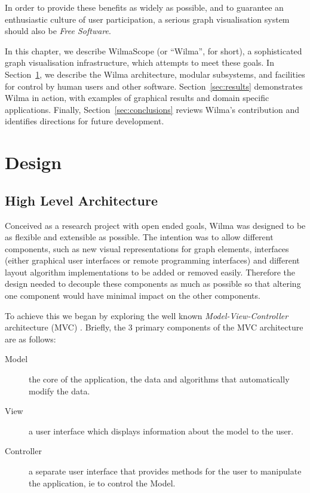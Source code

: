\documentclass[runningheads]{cl2emult}
\begin{document}
In order to provide these benefits as widely as possible, and to guarantee
an enthusiastic culture of user participation, a serious graph visualisation
system should also be {\em Free Software}\cite{stallman92why}.

In this chapter, we describe WilmaScope (or ``Wilma'', for short), a
sophisticated graph visualisation infrastructure, which attempts to meet
these goals.  In Section~\ref{sec:design}, we describe the Wilma
architecture, modular subsystems, and facilities for control by human users
and other software.  Section~\ref{sec:results} demonstrates Wilma in action,
with examples of graphical results and domain specific applications.
Finally, Section~\ref{sec:conclusions} reviews Wilma's contribution and
identifies directions for future development.

\section{Design}\label{sec:design}
\subsection{High Level Architecture}
Conceived as a research project with open ended goals, Wilma was
designed to be as flexible and extensible as possible.  The intention
was to allow different components, such as new visual representations
for graph elements, interfaces (either graphical user interfaces or
remote programming interfaces) and different 
layout algorithm implementations to be added or removed easily.
Therefore the design needed to decouple these components as much as
possible so that altering one component would have minimal impact on
the other components.

To achieve this we began by exploring the well known {\em
Model-View-Controller} architecture (MVC) \cite{gamma94design}.
Briefly, the 3 primary components of the MVC architecture are as
follows: 

\begin{description}
\item[Model] the core
of the application, the data and algorithms that automatically modify
the data. 
\item[View] a user interface which displays information
about the model to the user. 
\item[Controller] a separate user
interface that provides methods for the user to manipulate the
application, ie to control the Model.  
\end{description}
\end{document}
